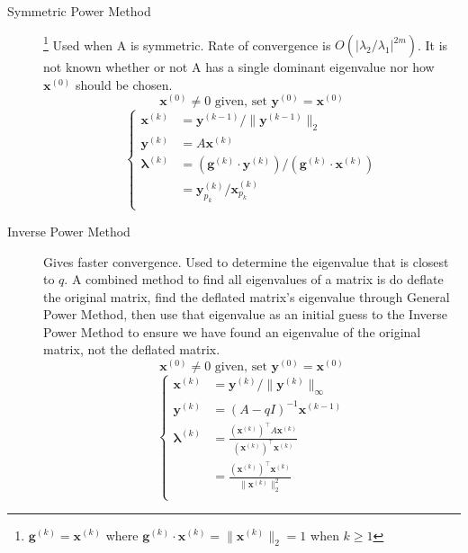 \documentclass[8pt]{article}
\begin{document}
\begin{multicols}{2}
\begin{description}
  \item[Symmetric Power Method] \footnote{\label{ft:sympowmtd_g}$\mathbf{g}^{(k)} =
      \mathbf{x}^{(k)}$ where $\mathbf{g}^{(k)}\cdot\mathbf{x}^{(k)}=\|\mathbf{x}^{(k)}\|_2=1$ when $k \geq 1$} 
    Used when A is symmetric. Rate of convergence is $O(|\lambda_2/\lambda_1|^{2m})$. It is not
    known whether or not A has a single dominant eigenvalue nor how $\mathbf{x}^{(0)}$ should be chosen. 
    $$\mathbf{x}^{(0)} \neq 0 \text{ given, set } \mathbf{y}^{(0)}=\mathbf{x}^{(0)}$$
    \begin{equation*}
      \left\{
    \begin{aligned}
        \mathbf{x}^{(k)} &= \mathbf{y}^{(k-1)}/\|\mathbf{y}^{(k-1)}\|_2 \\
        \mathbf{y}^{(k)} &= A\mathbf{x}^{(k)} \\
        \boldsymbol{\lambda}^{(k)} &= (\mathbf{g}^{(k)} \cdot \mathbf{y}^{(k)})/(\mathbf{g}^{(k)} \cdot \mathbf{x}^{(k)}) \\
        &=\mathbf{y}^{(k)}_{p_k}/\mathbf{x}^{(k)}_{p_k} \\
      \end{aligned}
      \right.
    \end{equation*}
  \item[Inverse Power Method] Gives faster convergence. Used to determine the eigenvalue that is
    closest to $q$. A combined method to find all eigenvalues of a matrix is do deflate the original
    matrix, find the deflated matrix's eigenvalue through General Power Method, then use that eigenvalue
    as an initial guess to the Inverse Power Method to ensure we have found an eigenvalue of the
    original matrix, not the deflated matrix.
    $$\mathbf{x}^{(0)} \neq 0 \text{ given, set } \mathbf{y}^{(0)}=\mathbf{x}^{(0)}$$
    \begin{equation*}
      \left\{
    \begin{aligned}
        \mathbf{x}^{(k)} &= \mathbf{y}^{(k)}/\|\mathbf{y}^{(k)}\|_\infty \\
        \mathbf{y}^{(k)} &= (A-qI)^{-1}\mathbf{x}^{(k-1)} \\
        \boldsymbol{\lambda}^{(k)} &= \frac{(\mathbf{x}^{(k)})^\top A\mathbf{x}^{(k)}}{(\mathbf{x}^{(k)})^\top\mathbf{x}^{(k)}}\\
        &=\frac{(\mathbf{x}^{(k)})^\top\mathbf{x}^{(k)}}{\|\mathbf{x}^{(k)}\|^2_2}\\
      \end{aligned}

\end{equation*}
\end{description}
\end{multicols}
\end{document}
